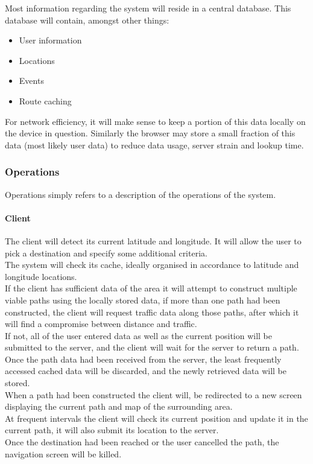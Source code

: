 \documentclass[12pt,a4paper]{article}
\begin{document}
				Most information regarding the system will reside in a central
				database. This database will contain, amongst other things:

				\begin{itemize}
					\item User information
					\item Locations
					\item Events
					\item Route caching
				\end{itemize}

				For network efficiency, it will make sense to keep a portion of this
				data locally on the device in question. Similarly the browser may store
				a small fraction of this data (most likely user data) to reduce data
				usage, server strain and lookup time.

			\subsubsection{Operations}

				Operations simply refers to a description of the operations of the system. 
				
				\paragraph{Client}
				
					The client will detect its current latitude and longitude. It will allow 
					the user to pick a destination and specify some additional criteria. \\
					The system will check its cache, ideally organised in accordance to latitude 
					and longitude locations. \\
					If the client has sufficient data of the area it will attempt to construct 
					multiple viable paths using the locally stored data, if more than one path 
					had been constructed, the client will request traffic data along those paths, 
					after which it will find a compromise between distance and traffic.\\
					If not, all of the user entered data as well as the current position will 
					be submitted to the server, and the client will wait for the server to return 
					a path.\\
					Once the path data had been received from the server, the least frequently 
					accessed cached data will be discarded, and the newly retrieved data will be stored.\\
					When a path had been constructed the client will, be redirected to a new screen 
					displaying the current path and map of the surrounding area.\\
					At frequent intervals the client will check its current position and update it in the 
					current path, it will also submit its location to the server.\\
					Once the destination had been reached or the user cancelled the path, the navigation 
					screen will be killed.
					
\end{document}
